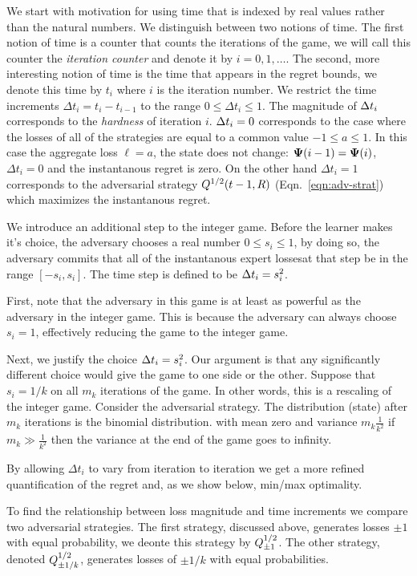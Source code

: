 \documentclass{article}[12pt]
\begin{document}
We start with motivation for using time that is indexed by real
values rather than the natural numbers. We distinguish between two
notions of time. The first notion of time is a counter that
counts the iterations of the game, we will call this counter the {\em
  iteration counter } and denote it by $i=0,1,\ldots$. The second,
more interesting notion of time is the time that appears in the regret
bounds, we denote this time by $t_i$ where $i$ is the iteration
number. We restrict the time increments $\Delta t_i =t_i-t_{i-1}$ to
the range $0\leq \Delta t_i \leq 1$.  The magnitude of $\Delta t_i$
corresponds to the {\em hardness} of iteration $i$. $\Delta t_i=0$
corresponds to the case where the losses of all of the strategies are
equal to a common value $-1 \leq a \leq 1$. In this case the aggregate
loss $\ell=a$, the state does not change:
${\bf \Psi}(i-1)={\bf \Psi}(i)$, $\Delta t_i=0$ and the instantanous regret is zero. On the
other hand $\Delta t_i=1$ corresponds to the adversarial strategy
$Q^{1/2}(t-1,R)$ (Eqn.~\ref{eqn:adv-strat}) which maximizes the
instantanous regret.

We introduce an additional step to the integer game. Before the
learner makes it's choice, the 
adversary chooses a real number $0 \leq s_i \leq 1$, by doing so, the
adversary commits that all of the instantanous expert lossesat that
step be in the range $[-s_i,s_i]$. The time step is defined to be $\Delta t_i =
s_i^2$.

First, note that the adversary in this game is at least as powerful as
the adversary in the integer game. This is because the adversary can
always choose $s_i=1$, effectively reducing the game to the integer
game.

Next, we justify the choice $\Delta t_i = s_i^2$. Our argument is that
any significantly different choice would give the game to one side or
the other.  Suppose that $s_i = 1/k$ on all $m_k$ iterations of the game. In
other words, this is a rescaling of the integer game. Consider the
adversarial strategy. The distribution (state) after $m_k$ iterations is the
binomial distribution. with mean zero and variance $m_k \frac{1}{k^2}$
if $m_k \gg \frac{1}{k^2}$ then the variance at the end of the game
goes to infinity.

By allowing $\Delta t_i$ to vary from iteration to iteration
we get a more refined quantification of the regret and, as we show
below, min/max optimality.

To find the relationship between loss magnitude and time increments 
we compare two adversarial strategies.  The first strategy, discussed above,
generates losses $\pm 1$ with equal probability, we deonte this
strategy by $Q^{1/2}_{\pm 1}$. The other strategy, denoted
$Q^{1/2}_{\pm 1/k}$, generates losses of $\pm 1/k$ with equal
probabilities.
\end{document}
